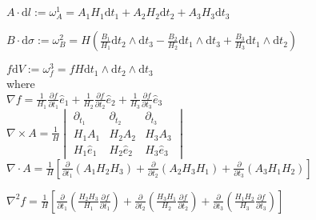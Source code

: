 \documentclass[10pt]{article}
\begin{document}
$A\cdot \mathrm{d}l:=\omega_{A}^1=A_1H_1\mathrm{d}t_1+A_2H_2\mathrm{d}t_2+A_3H_3\mathrm{d}t_3$

$\displaystyle{B\cdot \mathrm{d}\sigma}:=\omega_{B}^2=H\left( \frac{B_1}{H_1}\mathrm{d}t_2 \wedge \mathrm{d}t_3-\frac{B_2}{H_2}\mathrm{d}t_1 \wedge \mathrm{d}t_3+\frac{B_3}{H_3}\mathrm{d}t_1 \wedge \mathrm{d}t_2\right)$

$\displaystyle{f \mathrm{d}V:=\omega_{f}^3=f H\mathrm{d}t_1 \wedge \mathrm{d}t_2\wedge \mathrm{d}t_3}$
\\
where
\\
\indent $\displaystyle{\nabla f = \frac{1}{H_{1}} \frac{\partial f}{\partial t_{1}}\hat{e}_{1} +\frac{1}{H_{2}} \frac{\partial f}{\partial t_{2}}\hat{e}_{2} +\frac{1}{H_{3}} \frac{\partial f}{\partial t_{3}}\hat{e}_{3}}$
\\

\indent $\displaystyle{\nabla \times A =\frac{1}{H} 
\begin{vmatrix} 
\partial_{t_1}  & \partial_{t_2} & \partial_{t_3}\\
H_1A_1 & H_2A_2 & H_3A_3\\
H_1\hat{e}_{1} & H_2\hat{e}_{2} & H_3\hat{e}_{3}
 \end{vmatrix}
}$
\\

$\displaystyle{\nabla \cdot A = \frac{1}{H} 
\left[\frac{\partial}{\partial t_1}(A_1 H_2 H_3)+\frac{\partial}{\partial t_2}(A_2 H_3 H_1) + \frac{\partial}{\partial t_3}(A_3 H_1 H_2) \right]}$

$\displaystyle{\nabla^{2} f = \frac{1}{H} \left[
\frac{\partial}{\partial t_{1}} \left( \frac{H_{2} H_{3}}{H_{1}} \frac{\partial f}{\partial t_{1}} \right) +
\frac{\partial}{\partial t_{2}} \left( \frac{H_{3} H_{1}}{H_{2}} \frac{\partial f}{\partial t_{2}} \right) +
\frac{\partial}{\partial t_{3}} \left(\frac{H_{1} H_{2}}{H_{3}} \frac{\partial f}{\partial t_{3}} \right)
\right]}$
\end{document}
